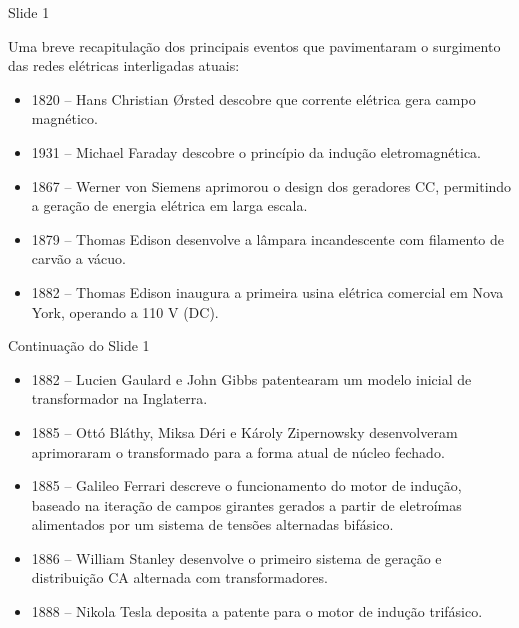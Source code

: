 
\begin{frame}{Slide 1}

    Uma breve recapitulação dos principais eventos que pavimentaram o surgimento das redes elétricas interligadas atuais:
    \begin{itemize}
        \item<2|alert@2> 1820 -- Hans Christian Ørsted descobre que corrente elétrica gera campo magnético.
        \item<3|alert@3> 1931 -- Michael Faraday descobre o princípio da indução eletromagnética.
        \item<4|alert@4> 1867 -- Werner von Siemens aprimorou o design dos geradores CC, permitindo a geração de energia elétrica em larga escala.
        \item<5|alert@5> 1879 -- Thomas Edison desenvolve a lâmpara incandescente com filamento de carvão a vácuo.
        \item<6|alert@6> 1882 -- Thomas Edison inaugura a primeira usina elétrica comercial em Nova York, operando a 110 V (DC).
    \end{itemize}

\end{frame}
\begin{frame}{Continuação do Slide 1}
    \begin{itemize}
        \item<1|alert@1> 1882 -- Lucien Gaulard e John Gibbs patentearam um modelo inicial de transformador na Inglaterra.
        \item<2|alert@2> 1885 -- Ottó Bláthy, Miksa Déri e Károly Zipernowsky desenvolveram aprimoraram o transformado para a forma atual de núcleo fechado.
        \item<3|alert@3> 1885 -- Galileo Ferrari descreve o funcionamento do motor de indução, baseado na iteração de campos girantes gerados a partir de eletroímas alimentados por um sistema de tensões alternadas bifásico.
        \item<3|alert@3> 1886 -- William Stanley desenvolve o primeiro sistema de geração e distribuição CA alternada com transformadores.
        \item<4|alert@4> 1888 -- Nikola Tesla deposita a patente para o motor de indução trifásico.
    \end{itemize}
\end{frame}
